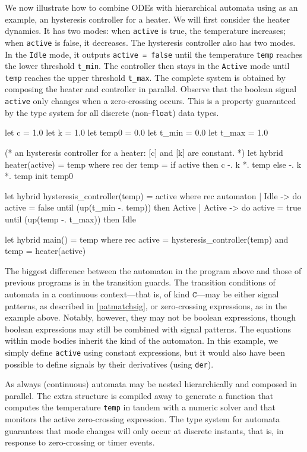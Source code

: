 \documentclass[11pt,titlepage,twoside]{report}
\makeatletter
\newcommand{\zls}[1]{{\@span{class="zelusinline"}#1}}
\newcommand{\zls}[1]{\texttt{#1}}
\renewcommand{\zls}[1]{\texttt{#1}}
\newcommand{\HybridKind}{\ensuremath{\mathtt{C}}}
\makeatother
\begin{document}
We now illustrate how to combine ODEs with hierarchical automata using as an 
example, an hysteresis controller for a heater.
We will first consider the heater dynamics.
It has two modes: when \zls{active} is true, the temperature increases; when 
\zls{active} is false, it decreases.
The hysteresis controller also has two modes.
In the \zls{Idle} mode, it outputs \zls{active = false} until the 
temperature \zls{temp} reaches the lower threshold \zls{t\_min}.
The controller then stays in the \zls{Active} mode until \zls{temp} reaches 
the upper threshold \zls{t\_max}.
The complete system is obtained by composing the heater and controller in 
parallel.
Observe that the boolean signal \zls{active} only changes when a 
zero-crossing occurs.
This is a property guaranteed by the type system for all discrete 
(non-\zls{float}) data types.
%
\begin{chklisting}
let c = 1.0
let k = 1.0
let temp0 = 0.0
let t_min = 0.0
let t_max = 1.0
\end{chklisting}
\begin{chklisting}[continue]
(* an hysteresis controller for a heater: [c] and [k] are constant. *)
let hybrid heater(active) = temp where
  rec der temp = if active then c -. k *. temp else -. k *. temp init temp0

let hybrid hysteresis_controller(temp) = active where
  rec automaton
      | Idle -> do active = false until (up(t_min -. temp)) then Active
      | Active -> do active = true until (up(temp -. t_max)) then Idle
 
let hybrid main() = temp where
  rec active = hysteresis_controller(temp)
  and temp = heater(active)
\end{chklisting}

\noindent
The biggest difference between the automaton in the program above and those 
of previous programs is in the transition guards.
The transition conditions of automata in a continuous context---that is, of 
kind \HybridKind---may be either signal patterns, as described in 
\cref{patmatchsig}, or zero-crossing expressions, as in the example above.
Notably, however, they may not be boolean expressions, though boolean 
expressions may still be combined with signal patterns.
The equations within mode bodies inherit the kind of the automaton.
In this example, we simply define \zls{active} using constant expressions, 
but it would also have been possible to define signals by their derivatives 
(using \zls{der}).

As always (continuous) automata may be nested hierarchically and composed in 
parallel.
The extra structure is compiled away to generate a function that computes 
the temperature \zls{temp} in tandem with a numeric solver and that monitors 
the active zero-crossing expression.
The type system for automata~\cite{lucy:emsoft11} guarantees that mode 
changes will only occur at discrete instants, that is, in response to 
zero-crossing or timer events.
\end{document}

